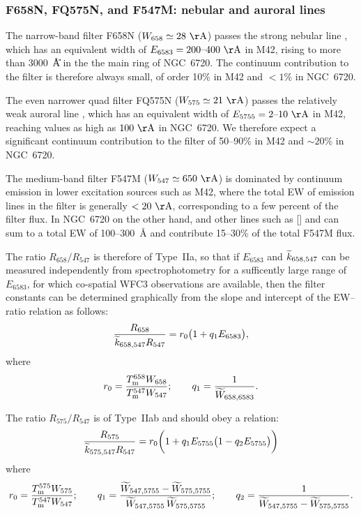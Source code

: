 \documentclass[preprint, 10pt]{aastex}
\begin{document}
\subsubsection{F658N, FQ575N, and F547M: \nii{} nebular and auroral lines}
\label{sec:658-575-547}

The narrow-band filter F658N (\(W_{658} \simeq 28~\U{\AA}\)) passes
the strong nebular line \nii{} , which has an equivalent
width of \(E_{6583} = 200\textrm{--}400~\U{\AA}\) in M42, rising to
more than 3000~\U{\AA} in the the main ring of NGC~6720.
The continuum contribution to the filter is therefore always small, of
order 10\% in M42 and \(< 1\%\) in NGC~6720.

The even narrower quad filter FQ575N (\(W_{575} \simeq 21~\U{\AA}\))
passes the relatively weak auroral line \nii{} , which has
an equivalent width of \(E_{5755} = 2\textrm{--}10~\U{\AA}\) in M42,
reaching values as high as \(100~\U{\AA}\) in NGC~6720.  We therefore
expect a significant continuum contribution to the filter of 50--90\%
in M42 and \(\sim 20\%\) in NGC~6720.

The medium-band filter F547M (\(W_{547} \simeq 650~\U{\AA}\)) is
dominated by continuum emission in lower excitation sources such as
M42, where the total EW of emission lines in the filter is generally
\(< 20~\U{\AA}\), corresponding to a few percent of the filter flux.
In NGC~6720 on the other hand, \nii{}  and other lines such
as []  and   can sum to
a total EW of 100--300~\AA{} and contribute 15--30\% of the total
F547M flux.

The ratio \(R_{658} / R_{547}\) is therefore of Type~IIa, so that if
\(E_{6583}\) and \(\widetilde{k}_{658, 547}\) can be measured independently
from spectrophotometry for a sufficently large range of \(E_{6583}\),
for which co-spatial WFC3 observations are available, then the filter constants can be determined graphically from the slope and
intercept of the EW--ratio relation as follows:
\begin{equation}
  \label{eq:658-547}
  \frac{R_{658}}{\widetilde{k}_{658, 547} R_{547}} = 
  r_0 \bigl( 
  1 + q_1 E_{6583}  
  \bigr) , 
\end{equation}
where
\[
r_0 = \frac{T_{\mathrm{m}}^{658} W_{658}}{T_{\mathrm{m}}^{547} W_{547}} ;
\quad\quad
q_1 = \frac{1}{\widetilde{W}_{658, 6583}} .
\]

The ratio \(R_{575} / R_{547}\) is of Type~IIab and should obey a relation:
\begin{equation}
  \label{eq:575-547}
  \frac{R_{575}}{\widetilde{k}_{575, 547} R_{547}} = 
  r_0 \biggl( 
    1 + q_1 E_{5755} \bigl( 
      1 - q_2 E_{5755}
    \bigr)
  \biggr)
\end{equation}
where
\[
r_0 = \frac{T_{\mathrm{m}}^{575} W_{575}}{T_{\mathrm{m}}^{547} W_{547}} ;
\quad\quad
q_1 = \frac{\widetilde{W}_{547, 5755} - \widetilde{W}_{575, 5755}}{\widetilde{W}_{547, 5755} \, \widetilde{W}_{575, 5755}} ;
\quad\quad
q_2 = \frac{1}{\widetilde{W}_{547, 5755} - \widetilde{W}_{575, 5755}} .
\]
\end{document}
